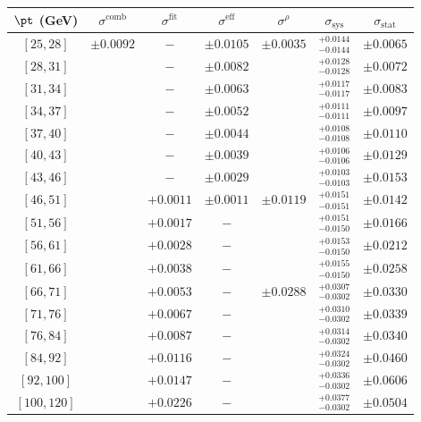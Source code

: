 \begin{tabular}{c||c|c|c|c||c|c}
$\pt$ (GeV) & $\sigma^{\text{comb}}$ & $\sigma^{\text{fit}}$ & $\sigma^{\text{eff}}$ & $\sigma^\rho$ & $\sigma_{\text{sys}}$ & $\sigma_{\text{stat}}$ \\
\hline
$[25, 28]$ & \multirow{17}{*}{$\pm0.0092$} & $-$ & $\pm0.0105$ & \multirow{7}{*}{$\pm0.0035$} & $^{+0.0144}_{-0.0144}$ & $\pm0.0065$\\
$[28, 31]$ &  & $-$ & $\pm0.0082$ &  & $^{+0.0128}_{-0.0128}$ & $\pm0.0072$\\
$[31, 34]$ &  & $-$ & $\pm0.0063$ &  & $^{+0.0117}_{-0.0117}$ & $\pm0.0083$\\
$[34, 37]$ &  & $-$ & $\pm0.0052$ &  & $^{+0.0111}_{-0.0111}$ & $\pm0.0097$\\
$[37, 40]$ &  & $-$ & $\pm0.0044$ &  & $^{+0.0108}_{-0.0108}$ & $\pm0.0110$\\
$[40, 43]$ &  & $-$ & $\pm0.0039$ &  & $^{+0.0106}_{-0.0106}$ & $\pm0.0129$\\
$[43, 46]$ &  & $-$ & $\pm0.0029$ &  & $^{+0.0103}_{-0.0103}$ & $\pm0.0153$\\\cline{5-5}
$[46, 51]$ &  & $+0.0011$ & $\pm0.0011$ & \multirow{4}{*}{$\pm0.0119$} & $^{+0.0151}_{-0.0151}$ & $\pm0.0142$\\
$[51, 56]$ &  & $+0.0017$ & $-$ &  & $^{+0.0151}_{-0.0150}$ & $\pm0.0166$\\
$[56, 61]$ &  & $+0.0028$ & $-$ &  & $^{+0.0153}_{-0.0150}$ & $\pm0.0212$\\
$[61, 66]$ &  & $+0.0038$ & $-$ &  & $^{+0.0155}_{-0.0150}$ & $\pm0.0258$\\\cline{5-5}
$[66, 71]$ &  & $+0.0053$ & $-$ & \multirow{6}{*}{$\pm0.0288$} & $^{+0.0307}_{-0.0302}$ & $\pm0.0330$\\
$[71, 76]$ &  & $+0.0067$ & $-$ &  & $^{+0.0310}_{-0.0302}$ & $\pm0.0339$\\
$[76, 84]$ &  & $+0.0087$ & $-$ &  & $^{+0.0314}_{-0.0302}$ & $\pm0.0340$\\
$[84, 92]$ &  & $+0.0116$ & $-$ &  & $^{+0.0324}_{-0.0302}$ & $\pm0.0460$\\
$[92, 100]$ &  & $+0.0147$ & $-$ &  & $^{+0.0336}_{-0.0302}$ & $\pm0.0606$\\
$[100, 120]$ &  & $+0.0226$ & $-$ &  & $^{+0.0377}_{-0.0302}$ & $\pm0.0504$\\
\end{tabular}
